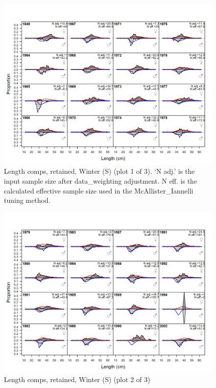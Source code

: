 \documentclass[12pt,]{article}
\begin{document}
\begin{figure}
\centering
\includegraphics{r4ss/plots_mod1/comp_lenfit_flt3mkt2_page1.png}
\caption{Length comps, retained, Winter (S) (plot 1 of 3). `N adj.' is
the input sample size after data\_weighting adjustment. N eff. is the
calculated effective sample size used in the McAllister\_Iannelli tuning
method. \label{fig:length_fits}}
\end{figure}

\begin{figure}
\centering
\includegraphics{r4ss/plots_mod1/comp_lenfit_flt3mkt2_page2.png}
\caption{Length comps, retained, Winter (S) (plot 2 of 3)
\label{fig:length_fits}}
\end{figure}
\end{document}
